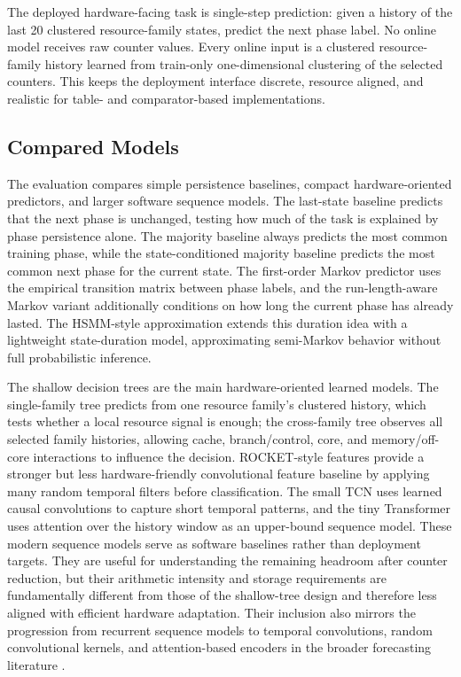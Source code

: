 \documentclass[10pt,twocolumn]{article}
\begin{document}
The deployed hardware-facing task is single-step prediction: given a history of the last 20 clustered resource-family states, predict the next phase label.
No online model receives raw counter values.
Every online input is a clustered resource-family history learned from train-only one-dimensional clustering of the selected counters.
This keeps the deployment interface discrete, resource aligned, and realistic for table- and comparator-based implementations.

\subsection{Compared Models}

The evaluation compares simple persistence baselines, compact hardware-oriented predictors, and larger software sequence models.
The last-state baseline predicts that the next phase is unchanged, testing how much of the task is explained by phase persistence alone.
The majority baseline always predicts the most common training phase, while the state-conditioned majority baseline predicts the most common next phase for the current state.
The first-order Markov predictor uses the empirical transition matrix between phase labels, and the run-length-aware Markov variant additionally conditions on how long the current phase has already lasted.
The HSMM-style approximation extends this duration idea with a lightweight state-duration model, approximating semi-Markov behavior without full probabilistic inference.

The shallow decision trees are the main hardware-oriented learned models.
The single-family tree predicts from one resource family's clustered history, which tests whether a local resource signal is enough; the cross-family tree observes all selected family histories, allowing cache, branch/control, core, and memory/off-core interactions to influence the decision.
ROCKET-style features provide a stronger but less hardware-friendly convolutional feature baseline by applying many random temporal filters before classification.
The small TCN uses learned causal convolutions to capture short temporal patterns, and the tiny Transformer uses attention over the history window as an upper-bound sequence model.
These modern sequence models serve as software baselines rather than deployment targets.
They are useful for understanding the remaining headroom after counter reduction, but their arithmetic intensity and storage requirements are fundamentally different from those of the shallow-tree design and therefore less aligned with efficient hardware adaptation.
Their inclusion also mirrors the progression from recurrent sequence models to temporal convolutions, random convolutional kernels, and attention-based encoders in the broader forecasting literature \cite{hochreiter1997lstm,bai2018tcn,dempster2020rocket,vaswani2017attention}.
\end{document}
